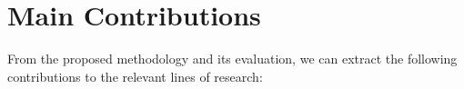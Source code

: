 \section{Main Contributions}
\label{Sec:MainContributions}




From the proposed methodology and its evaluation, we can extract the following contributions to the relevant lines of research:

